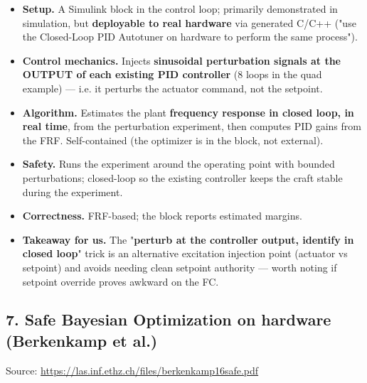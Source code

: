 \documentclass[
  11pt,
]{article}
\providecommand{\tightlist}{%
  \setlength{\itemsep}{0pt}\setlength{\parskip}{0pt}}
\begin{document}
\begin{itemize}
\tightlist
\item
  \textbf{Setup.} A Simulink block in the control loop; primarily
  demonstrated in simulation, but \textbf{deployable to real hardware}
  via generated C/C++ ("use the Closed-Loop PID Autotuner on hardware to
  perform the same process").
\item
  \textbf{Control mechanics.} Injects \textbf{sinusoidal perturbation
  signals at the OUTPUT of each existing PID controller} (8 loops in the
  quad example) --- i.e. it perturbs the actuator command, not the
  setpoint.
\item
  \textbf{Algorithm.} Estimates the plant \textbf{frequency response in
  closed loop, in real time}, from the perturbation experiment, then
  computes PID gains from the FRF. Self-contained (the optimizer is in
  the block, not external).
\item
  \textbf{Safety.} Runs the experiment around the operating point with
  bounded perturbations; closed-loop so the existing controller keeps
  the craft stable during the experiment.
\item
  \textbf{Correctness.} FRF-based; the block reports estimated margins.
\item
  \textbf{Takeaway for us.} The "\textbf{perturb at the controller
  output, identify in closed loop}" trick is an alternative excitation
  injection point (actuator vs setpoint) and avoids needing clean
  setpoint authority --- worth noting if setpoint override proves
  awkward on the FC.
\end{itemize}

\hypertarget{7-safe-bayesian-optimization-on-hardware-berkenkamp-et-al}{%
\subsection{7. Safe Bayesian Optimization on hardware (Berkenkamp et
al.)}\label{7-safe-bayesian-optimization-on-hardware-berkenkamp-et-al}}

Source: \url{https://las.inf.ethz.ch/files/berkenkamp16safe.pdf}
\end{document}
